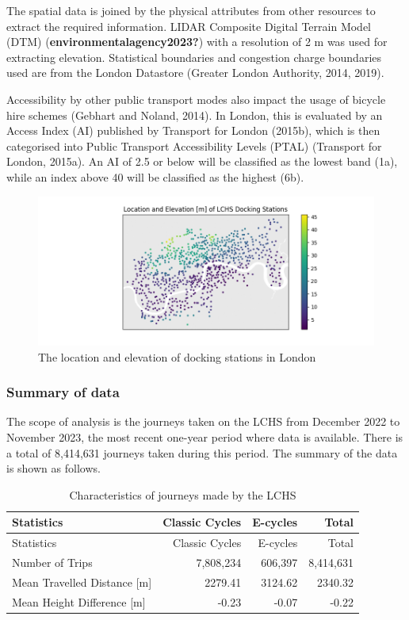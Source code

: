 \documentclass[
  a4paper,
  DIV=11,
  numbers=noendperiod]{scrartcl}
\begin{document}
The spatial data is joined by the physical attributes from other
resources to extract the required information. LIDAR Composite Digital
Terrain Model (DTM) (\textbf{environmentalagency2023?}) with a
resolution of 2 m was used for extracting elevation. Statistical
boundaries and congestion charge boundaries used are from the London
Datastore (Greater London Authority, 2014, 2019).

Accessibility by other public transport modes also impact the usage of
bicycle hire schemes (Gebhart and Noland, 2014). In London, this is
evaluated by an Access Index (AI) published by Transport for London
(2015b), which is then categorised into Public Transport Accessibility
Levels (PTAL) (Transport for London, 2015a). An AI of 2.5 or below will
be classified as the lowest band (1a), while an index above 40 will be
classified as the highest (6b).

\begin{figure}

{\centering \includegraphics{img/docking_stations.png}

}

\caption{The location and elevation of docking stations in London}

\end{figure}

\hypertarget{summary-of-data}{%
\subsubsection{Summary of data}\label{summary-of-data}}

The scope of analysis is the journeys taken on the LCHS from December
2022 to November 2023, the most recent one-year period where data is
available. There is a total of 8,414,631 journeys taken during this
period. The summary of the data is shown as follows.

\begin{longtable}[]{@{}lrrr@{}}
\caption{Characteristics of journeys made by the LCHS}\tabularnewline
\toprule\noalign{}
Statistics & Classic Cycles & E-cycles & Total \\
\midrule\noalign{}
\endfirsthead
\toprule\noalign{}
Statistics & Classic Cycles & E-cycles & Total \\
\midrule\noalign{}
\endhead
\bottomrule\noalign{}
\endlastfoot
Number of Trips & 7,808,234 & 606,397 & 8,414,631 \\
Mean Travelled Distance {[}m{]} & 2279.41 & 3124.62 & 2340.32 \\
Mean Height Difference {[}m{]} & -0.23 & -0.07 & -0.22 \\
\end{longtable}
\end{document}
